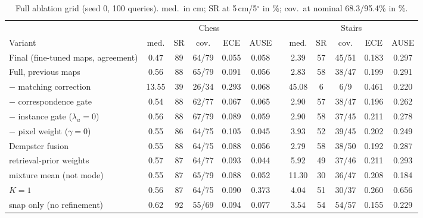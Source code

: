 \documentclass[journal]{IEEEtran}
\begin{document}
\begin{table}[t]
\caption{Full ablation grid (seed 0, 100 queries). med.\ in cm; SR at
5\,cm/5$^\circ$ in \%; cov.\ at nominal 68.3/95.4\% in \%.}
\label{tab:ablation-full}
\centering\scriptsize
\setlength{\tabcolsep}{3.5pt}
\begin{tabular}{@{}l ccccc c ccccc@{}}
\toprule
& \multicolumn{5}{c}{Chess} & & \multicolumn{5}{c}{Stairs} \\
\cmidrule(lr){2-6}\cmidrule(lr){8-12}
Variant & med. & SR & cov. & ECE & AUSE & & med. & SR & cov. & ECE & AUSE \\
\midrule
Final (fine-tuned maps, agreement)   & 0.47 & 89 & 64/79 & 0.055 & 0.058 & & 2.39 & 57 & 45/51 & 0.183 & 0.297 \\
Full, previous maps                  & 0.56 & 88 & 65/79 & 0.091 & 0.056 & & 2.83 & 58 & 38/47 & 0.199 & 0.291 \\
$-$ matching correction              & 13.55 & 39 & 26/34 & 0.293 & 0.068 & & 45.08 & 6 & 6/9 & 0.461 & 0.220 \\
$-$ correspondence gate              & 0.54 & 88 & 62/77 & 0.067 & 0.065 & & 2.90 & 57 & 38/47 & 0.196 & 0.262 \\
$-$ instance gate ($\lambda_u{=}0$)  & 0.56 & 88 & 67/79 & 0.089 & 0.059 & & 2.90 & 58 & 37/45 & 0.211 & 0.278 \\
$-$ pixel weight ($\gamma{=}0$)      & 0.55 & 86 & 64/75 & 0.105 & 0.045 & & 3.93 & 52 & 39/45 & 0.202 & 0.249 \\
Dempster fusion                      & 0.55 & 88 & 64/75 & 0.088 & 0.056 & & 2.79 & 58 & 38/50 & 0.192 & 0.287 \\
retrieval-prior weights              & 0.57 & 87 & 64/77 & 0.093 & 0.044 & & 5.92 & 49 & 37/46 & 0.211 & 0.293 \\
mixture mean (not mode)              & 0.55 & 87 & 65/79 & 0.088 & 0.052 & & 11.30 & 30 & 36/47 & 0.208 & 0.184 \\
$K{=}1$                              & 0.56 & 87 & 64/75 & 0.090 & 0.373 & & 4.04 & 51 & 30/37 & 0.260 & 0.656 \\
snap only (no refinement)            & 0.62 & 92 & 55/69 & 0.094 & 0.077 & & 3.54 & 54 & 54/57 & 0.155 & 0.229 \\
\bottomrule
\end{tabular}
\end{table}
\end{document}
